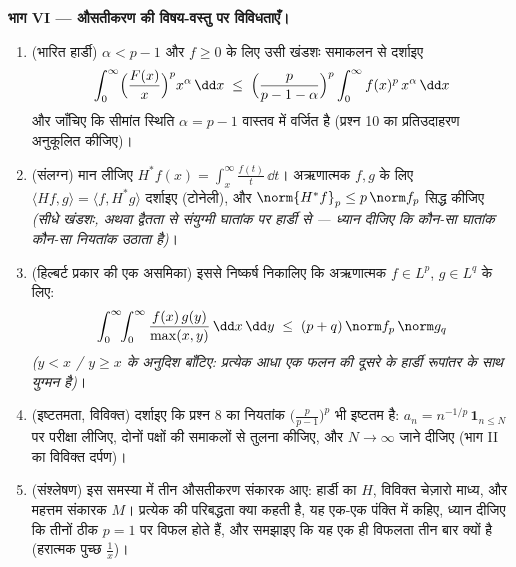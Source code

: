 \begin{problem}
\medskip
\noindent\textbf{भाग VI --- औसतीकरण की विषय-वस्तु पर विविधताएँ।}
\begin{enumerate}[resume]
  \item (भारित हार्डी) $\alpha < p - 1$ और $f \geq 0$ के लिए उसी खंडशः समाकलन से
        दर्शाइए
        \[
        \int_0^\infty\Bigl(\frac{F(x)}x\Bigr)^{p}
        x^{\alpha}\,\dd x \;\leq\;
        \Bigl(\frac{p}{p - 1 - \alpha}\Bigr)^{p}
        \int_0^\infty f(x)^p\,x^{\alpha}\,\dd x
        \]
        और जाँचिए कि सीमांत स्थिति $\alpha = p - 1$ वास्तव में वर्जित है
        (प्रश्न 10 का प्रतिउदाहरण अनुकूलित कीजिए)।
  \item (संलग्न) मान लीजिए $H^*f(x) =
        \int_x^{\infty}\frac{f(t)}t\,\dd t$। अऋणात्मक $f, g$ के लिए $\langle
        Hf, g\rangle = \langle f, H^*g\rangle$
        दर्शाइए (टोनेली), और $\norm{H^*f}_p \leq p\,\norm f_p$ सिद्ध कीजिए \emph{(सीधे खंडशः,
        अथवा द्वैतता से संयुग्मी घातांक पर हार्डी से --- ध्यान
        दीजिए कि कौन-सा घातांक कौन-सा नियतांक उठाता है)}।
  \item (हिल्बर्ट प्रकार की एक असमिका) इससे निष्कर्ष निकालिए कि
        अऋणात्मक $f \in L^p$, $g \in L^q$ के लिए:
        \[
        \int_0^\infty\!\!\int_0^\infty
        \frac{f(x)\,g(y)}{\max(x,y)}\,\dd x\,\dd y
        \;\leq\; (p + q)\,\norm f_p\,\norm g_q
        \]
        \emph{($y < x$ / $y \geq x$ के अनुदिश बाँटिए: प्रत्येक आधा एक
        फलन की दूसरे के हार्डी रूपांतर के साथ युग्मन है)}।
  \item (इष्टतमता, विविक्त) दर्शाइए कि प्रश्न 8 का नियतांक $\bigl(\frac p{p-1}\bigr)^p$
        भी इष्टतम है: $a_n = n^{-1/p}\,\mathbf 1_{n \leq
        N}$ पर परीक्षा लीजिए, दोनों पक्षों की
        समाकलों से तुलना कीजिए, और $N
        \to \infty$ जाने दीजिए (भाग II का
        विविक्त दर्पण)।
  \item (संश्लेषण) इस समस्या में तीन औसतीकरण संकारक आए: हार्डी का
        $H$, विविक्त चेज़ारो माध्य, और महत्तम संकारक $M$।
        प्रत्येक की परिबद्धता क्या कहती है, यह एक-एक पंक्ति में
        कहिए, ध्यान दीजिए कि तीनों ठीक $p = 1$ पर विफल होते हैं, और
        समझाइए कि यह एक ही विफलता तीन बार क्यों है (हरात्मक पुच्छ
        $\frac1x$)।
\end{enumerate}


\end{problem}
